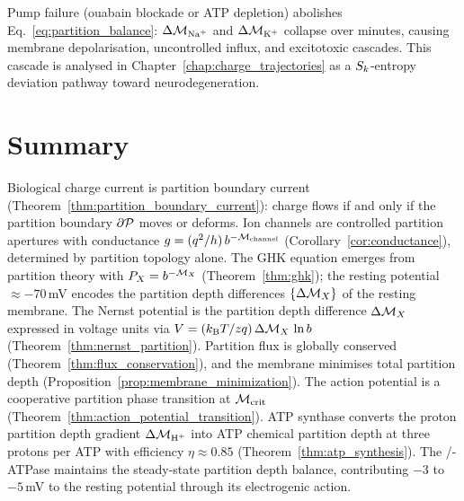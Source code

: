 Pump failure (ouabain blockade or ATP depletion) abolishes
Eq.~\eqref{eq:partition_balance}: $\Delta\Depth_{\ce{Na+}}$ and
$\Delta\Depth_{\ce{K+}}$ collapse over minutes, causing membrane
depolarisation, uncontrolled  influx, and excitotoxic cascades.
This cascade is analysed in Chapter~\ref{chap:charge_trajectories} as a
$S_k$-entropy deviation pathway toward neurodegeneration.

\section{Summary}
\label{sec:charge_current_summary}

\begin{chapterbox}
Biological charge current is partition boundary current
(Theorem~\ref{thm:partition_boundary_current}): charge flows if and only if
the partition boundary $\partial\mathcal{P}$ moves or deforms. Ion channels are
controlled partition apertures with conductance
$g = (q^2/h)\,b^{-\mathcal{M}_{\mathrm{channel}}}$
(Corollary~\ref{cor:conductance}), determined by partition topology alone.
The GHK equation emerges from partition theory with $P_X = b^{-\mathcal{M}_X}$
(Theorem~\ref{thm:ghk}); the resting potential $\approx -70$\,mV encodes the
partition depth differences $\{\Delta\mathcal{M}_X\}$ of the resting membrane.
The Nernst potential is the partition depth difference $\Delta\mathcal{M}_X$
expressed in voltage units via $V = (k_{\mathrm{B}} T/zq)\,\Delta\mathcal{M}_X\,\ln b$
(Theorem~\ref{thm:nernst_partition}). Partition flux is globally conserved
(Theorem~\ref{thm:flux_conservation}), and the membrane minimises total
partition depth (Proposition~\ref{prop:membrane_minimization}). The action
potential is a cooperative partition phase transition at $\mathcal{M}_{\mathrm{crit}}$
(Theorem~\ref{thm:action_potential_transition}). ATP synthase converts the
proton partition depth gradient $\Delta\Depth_{\ce{H+}}$ into ATP chemical
partition depth at three protons per ATP with efficiency $\eta \approx 0.85$
(Theorem~\ref{thm:atp_synthesis}). The /-ATPase maintains the
steady-state partition depth balance, contributing $-3$ to $-5$\,mV to the
resting potential through its electrogenic action.
\end{chapterbox}
